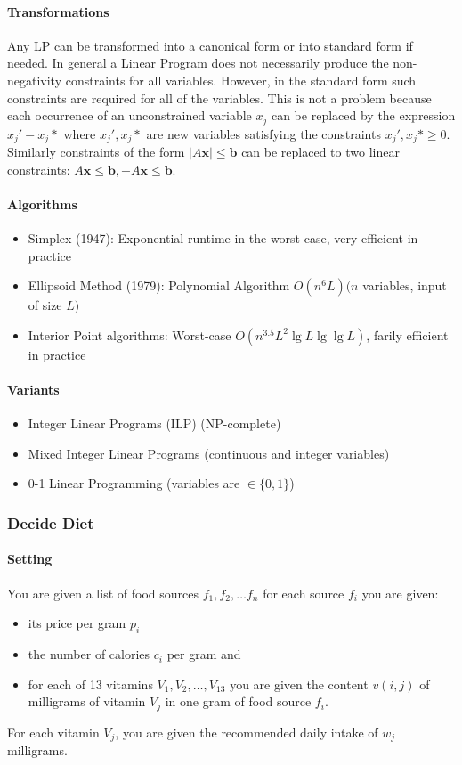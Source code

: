 \paragraph{Transformations}
Any LP can be transformed into a canonical form or into standard form if needed. In general a Linear Program does not necessarily produce the non-negativity constraints for all variables. However, in the standard form such constraints are required for all of the variables. This is not a problem because each occurrence of an unconstrained variable \(x_j\) can be replaced by the expression \(x_j'-x_j*\) where \(x_j', x_j*\) are new variables satisfying the constraints \(x_j', x_j* \geq 0\). Similarly constraints of the form \(|A\textbf{x}| \leq \textbf{b}\) can be replaced to two linear constraints: \(A\textbf{x} \leq \textbf{b} , -A\textbf{x} \leq \textbf{b}\).

\paragraph{Algorithms}
\begin{itemize}
    \item Simplex (1947): Exponential runtime in the worst case, very efficient in practice 
    \item Ellipsoid Method (1979): Polynomial Algorithm \(O(n^6L) (n\) variables, input of size \(L)\)
    \item Interior Point algorithms: Worst-case \(O(n^{3.5}L^2\lg L \lg \lg L)\), farily efficient in practice 
\end{itemize}

\paragraph{Variants}
\begin{itemize}
    \item Integer Linear Programs (ILP) (NP-complete)
    \item Mixed Integer Linear Programs (continuous and integer variables)
    \item 0-1 Linear Programming (variables are \(\in \{0, 1\}\))
\end{itemize}

\subsubsection{Decide Diet}
\paragraph{Setting}
You are given a list of food sources \(f_1,f_2,\dots f_n\) for each source \(f_i\) you are given:
\begin{itemize}
    \item its price per gram \(p_i\)
    \item the number of calories \(c_i\) per gram and
    \item for each of 13 vitamins \(V_1, V_2, \dots, V_{13}\) you are given the content \(v(i,j)\) of milligrams of vitamin \(V_j\) in one gram of food source \(f_i\).
\end{itemize}
For each vitamin \(V_j\), you are given the recommended daily intake of \(w_j\) milligrams.

